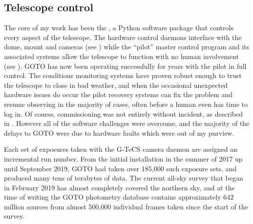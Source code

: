 \subsection{Telescope control}
\label{sec:control_results}
\begin{colsection}

The core of my work has been the , a Python software package that controls every aspect of the telescope. The hardware control daemons interface with the dome, mount and cameras (see ) while the ``pilot'' master control program and its associated systems allow the telescope to function with no human involvement (see ). GOTO has now been operating successfully for years with the pilot in full control. The conditions monitoring systems have proven robust enough to trust the telescope to close in bad weather, and when the occasional unexpected hardware issues do occur the pilot recovery systems can fix the problem and resume observing in the majority of cases, often before a human even has time to log in. Of course, commissioning was not entirely without incident, as described in . However all of the software challenges were overcome, and the majority of the delays to GOTO were due to hardware faults which were out of my purview.

Each set of exposures taken with the G-TeCS camera daemon are assigned an incremental run number. From the initial installation in the summer of 2017 up until September 2019, GOTO had taken over 185,000 such exposure sets, and produced many tens of terabytes of data. The current all-sky survey that began in February 2019 has almost completely covered the northern sky, and at the time of writing the GOTO photometry database contains approximately 642 million sources from almost 500,000 individual frames taken since the start of the survey.

\newpage

\end{colsection}


